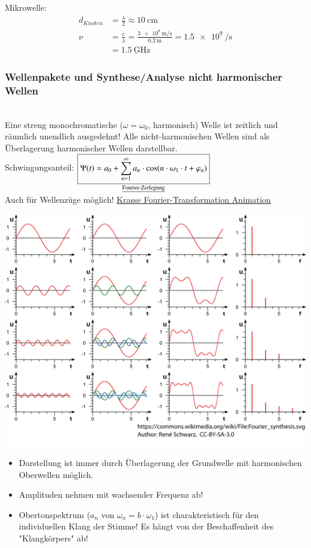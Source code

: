  Mikrowelle:
 \begin{align*}
 d_{Knoten} &= \frac{\lambda}{2} \approx \SI{10}{\centi\meter}\\
 \nu & = \frac{c}{\lambda} = \frac{\SI{3e8}{\meter\per\second}}{\SI{0,2}{\meter}} = \SI{1,5e9}{\per\second}\\
 &=\underline{\SI{1,5}{\giga\hertz}}
 \end{align*}
 
 \subsubsection{Wellenpakete und Synthese/Analyse nicht harmonischer Wellen} \hfill \\
 Eine streng monochromatische ($ \omega=\omega_0 $, harmonisch) Welle ist zeitlich und räumlich unendlich ausgedehnt! Alle nicht-harmonischen Wellen sind als Überlagerung harmonischer Wellen darstellbar. \\
 Schwingungsanteil: $ \underset{\text{\underline{Fourier-Zerlegung}}}{\boxed{\Psi(t) = a_0 + \sum_{n=1}^{\infty} a_n \cdot \cos(n\cdot\omega_1\cdot t + \varphi_n)}} $ \\
 Auch für Wellenzüge möglich!\enter
 \href{https://upload.wikimedia.org/wikipedia/commons/5/50/Fourier_transform_time_and_frequency_domains.gif}{Krasse Fourier-Transformation Animation}
\begin{center}
	\includegraphics[width=0.7\linewidth]{skizzen/19/19B16}
\end{center}
 \begin{itemize}
 	\item Darstellung ist immer durch Überlagerung der Grundwelle mit harmonischen Oberwellen möglich.
 	\item Amplituden nehmen mit wachsender Frequenz ab!
 	\item Obertonspektrum ($ a_n $ von $ \omega_n = b\cdot \omega_1 $) ist charakteristisch für den individuellen Klang der Stimme! Es hängt von der Beschaffenheit des "Klangkörpers" ab!
 \end{itemize}

